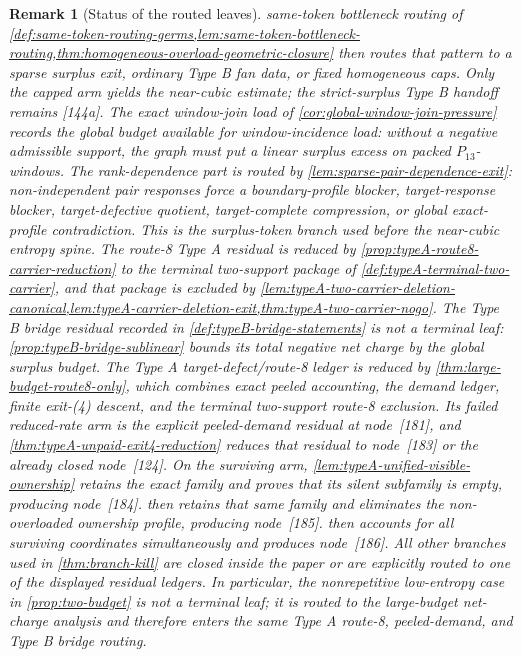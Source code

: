 \documentclass[11pt]{article}
\newtheorem{remark}[theorem]{Remark}
\begin{document}
\begin{remark}[Status of the routed leaves]
same-token bottleneck routing of
\cref{def:same-token-routing-germs,lem:same-token-bottleneck-routing,thm:homogeneous-overload-geometric-closure}
then routes that pattern to a sparse surplus exit, ordinary Type B
fan data, or fixed homogeneous caps.  Only the capped arm yields the
near-cubic estimate; the strict-surplus Type B handoff remains [144a].  The exact
window-join load of \cref{cor:global-window-join-pressure} records the
global budget available for window-incidence load: without a negative
admissible support, the graph must put a linear surplus excess on packed
\(P_{13}\)-windows.  The rank-dependence part is routed by
\cref{lem:sparse-pair-dependence-exit}: non-independent pair responses force a
boundary-profile blocker, target-response blocker, target-defective quotient,
target-complete compression, or global exact-profile contradiction.  This is
the surplus-token branch used before the near-cubic entropy spine.  The
route-8 Type A residual is reduced by
\cref{prop:typeA-route8-carrier-reduction} to the terminal two-support package
of \cref{def:typeA-terminal-two-carrier}, and that package is excluded by
\cref{lem:typeA-two-carrier-deletion-canonical,lem:typeA-carrier-deletion-exit,thm:typeA-two-carrier-nogo}.
The Type B bridge residual recorded in \cref{def:typeB-bridge-statements} is not
a terminal leaf: \cref{prop:typeB-bridge-sublinear} bounds its total negative
net charge by the global surplus budget.  The Type A target-defect/route-8
ledger is reduced by \cref{thm:large-budget-route8-only}, which combines exact
peeled accounting, the demand ledger, finite exit-\textup{(4)} descent, and the
terminal two-support route-8 exclusion.  Its failed reduced-rate arm is the
explicit peeled-demand residual at node~[181], and
\cref{thm:typeA-unpaid-exit4-reduction} reduces that residual to node~[183] or
the already closed node~[124].  On the surviving arm,
\cref{lem:typeA-unified-visible-ownership} retains the exact family and proves
that its silent subfamily is empty, producing node~[184].
 then retains that same family and
eliminates the non-overloaded ownership profile, producing node~[185].
 then accounts for all surviving
coordinates simultaneously and produces node~[186].  All other branches used in
\cref{thm:branch-kill} are closed inside the paper or are explicitly routed to
one of the displayed residual ledgers.
In particular, the nonrepetitive low-entropy case in \cref{prop:two-budget} is
not a terminal leaf; it is routed to the large-budget net-charge analysis and
therefore enters the same Type A route-8, peeled-demand, and Type B bridge
routing.
\end{remark}
\end{document}
